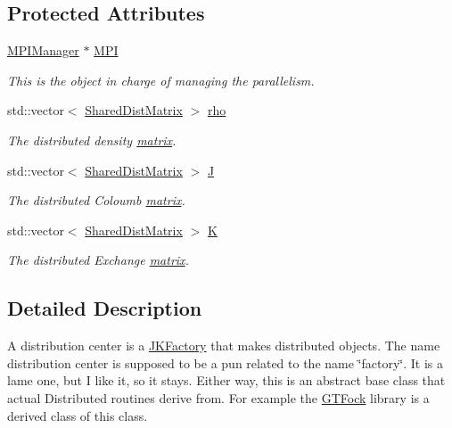 \subsection*{Protected Attributes}
\begin{DoxyCompactItemize}
\item 
\hyperlink{classJKBuilder_1_1MPIManager}{MPIManager} $\ast$ \hyperlink{classJKBuilder_1_1DistributionCenter_a3753afd7c89e077643a274ed7c4e9129}{MPI}
\begin{DoxyCompactList}\small\item\em This is the object in charge of managing the parallelism. \item\end{DoxyCompactList}\item 
std::vector$<$ \hyperlink{namespaceJKBuilder_a3b337e72f5cb0686ec93e063dda09c70}{SharedDistMatrix} $>$ \hyperlink{classJKBuilder_1_1DistributionCenter_aea5bfaa6247d7c03edf480fa8ecdd929}{rho}
\begin{DoxyCompactList}\small\item\em The distributed density \hyperlink{classJKBuilder_1_1matrix}{matrix}. \item\end{DoxyCompactList}\item 
std::vector$<$ \hyperlink{namespaceJKBuilder_a3b337e72f5cb0686ec93e063dda09c70}{SharedDistMatrix} $>$ \hyperlink{classJKBuilder_1_1DistributionCenter_a83e7fc1320b7071187dce35322e659b2}{J}
\begin{DoxyCompactList}\small\item\em The distributed Coloumb \hyperlink{classJKBuilder_1_1matrix}{matrix}. \item\end{DoxyCompactList}\item 
std::vector$<$ \hyperlink{namespaceJKBuilder_a3b337e72f5cb0686ec93e063dda09c70}{SharedDistMatrix} $>$ \hyperlink{classJKBuilder_1_1DistributionCenter_a36d7716ac07910f43805622922c1fb93}{K}
\begin{DoxyCompactList}\small\item\em The distributed Exchange \hyperlink{classJKBuilder_1_1matrix}{matrix}. \item\end{DoxyCompactList}\end{DoxyCompactItemize}


\subsection{Detailed Description}
A distribution center is a \hyperlink{classJKBuilder_1_1JKFactory}{JKFactory} that makes distributed objects. The name distribution center is supposed to be a pun related to the name \char`\"{}factory\char`\"{}. It is a lame one, but I like it, so it stays. Either way, this is an abstract base class that actual Distributed routines derive from. For example the \hyperlink{namespaceGTFock}{GTFock} library is a derived class of this class. 

